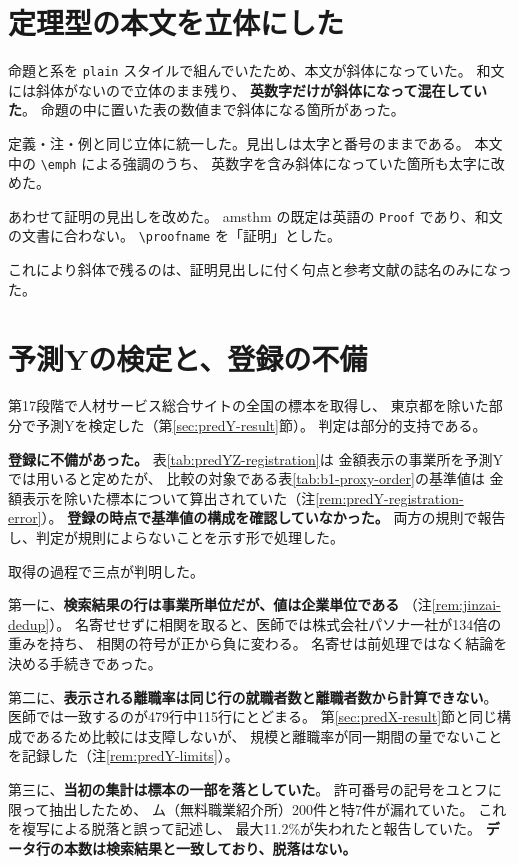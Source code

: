 \section{定理型の本文を立体にした}

命題と系を \texttt{plain} スタイルで組んでいたため、本文が斜体になっていた。
和文には斜体がないので立体のまま残り、
\textbf{英数字だけが斜体になって混在していた}。
命題の中に置いた表の数値まで斜体になる箇所があった。

定義・注・例と同じ立体に統一した。見出しは太字と番号のままである。
本文中の \verb|\emph| による強調のうち、
英数字を含み斜体になっていた箇所も太字に改めた。

あわせて証明の見出しを改めた。
amsthm の既定は英語の \texttt{Proof} であり、和文の文書に合わない。
\verb|\proofname| を「証明」とした。

これにより斜体で残るのは、証明見出しに付く句点と参考文献の誌名のみになった。

\section{予測Yの検定と、登録の不備}

第17段階で人材サービス総合サイトの全国の標本を取得し、
東京都を除いた部分で予測Yを検定した（第\ref{sec:predY-result}節）。
判定は部分的支持である。

\textbf{登録に不備があった。} 表\ref{tab:predYZ-registration}は
金額表示の事業所を予測Yでは用いると定めたが、
比較の対象である表\ref{tab:b1-proxy-order}の基準値は
金額表示を除いた標本について算出されていた（注\ref{rem:predY-registration-error}）。
\textbf{登録の時点で基準値の構成を確認していなかった。}
両方の規則で報告し、判定が規則によらないことを示す形で処理した。

取得の過程で三点が判明した。

第一に、\textbf{検索結果の行は事業所単位だが、値は企業単位である}
（注\ref{rem:jinzai-dedup}）。
名寄せせずに相関を取ると、医師では株式会社パソナ一社が134倍の重みを持ち、
相関の符号が正から負に変わる。
名寄せは前処理ではなく結論を決める手続きであった。

第二に、\textbf{表示される離職率は同じ行の就職者数と離職者数から計算できない}。
医師では一致するのが479行中115行にとどまる。
第\ref{sec:predX-result}節と同じ構成であるため比較には支障しないが、
規模と離職率が同一期間の量でないことを記録した（注\ref{rem:predY-limits}）。

第三に、\textbf{当初の集計は標本の一部を落としていた}。
許可番号の記号をユとフに限って抽出したため、
ム（無料職業紹介所）200件と特7件が漏れていた。
これを複写による脱落と誤って記述し、
最大11.2\%が失われたと報告していた。
\textbf{データ行の本数は検索結果と一致しており、脱落はない。}

